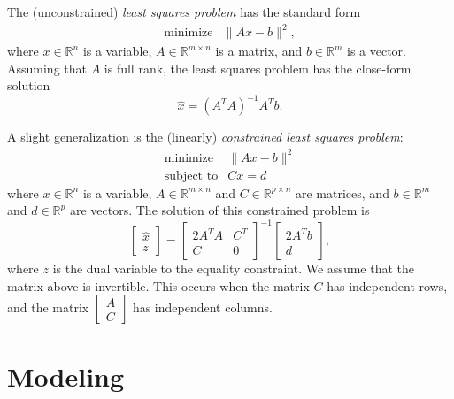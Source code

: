 \documentclass[12pt]{article}
\begin{document}
The (unconstrained) \emph{least squares problem} has the standard form
\begin{equation*}
  \begin{array}{ll}
    \mbox{minimize} & \|Ax-b\|^2,
  \end{array}
\end{equation*}
where $x \in \mathbb{R}^n$ is a variable, $A \in \mathbb{R}^{m \times n}$ is a
matrix, and $b \in \mathbb{R}^m$ is a vector.
Assuming that $A$ is full rank, the least squares problem has the close-form
solution
\begin{equation*}
  \hat x = (A^T A)^{-1} A^T b.
\end{equation*}

A slight generalization is the (linearly) \emph{constrained least squares problem}:
\begin{equation*}
  \begin{array}{ll}
    \mbox{minimize} & \|Ax-b\|^2 \\
    \mbox{subject to} & Cx = d
  \end{array}
\end{equation*}
where $x \in \mathbb{R}^{n}$ is a variable, $A \in \mathbb{R}^{m \times n}$ and
$C \in \mathbb{R}^{p \times n}$ are matrices, and $b \in \mathbb{R}^m$ and
$d \in \mathbb{R}^p$ are vectors. The solution of this constrained problem is
\begin{equation*}
  \left[\begin{array}{c} \hat x \\ z \end{array}\right] =
  \left[\begin{array}{cc} 2A^TA & C^T \\ C & 0 \end{array}\right]^{-1}
  \left[\begin{array}{c} 2A^Tb \\ d \end{array}\right],
\end{equation*}
where $z$ is the dual variable to the equality constraint.
We assume that the matrix above is invertible.
This occurs when the matrix $C$ has independent rows, and the matrix
$\begin{bmatrix} A \\ C \end{bmatrix}$ has independent columns.

\section{Modeling}
\end{document}
